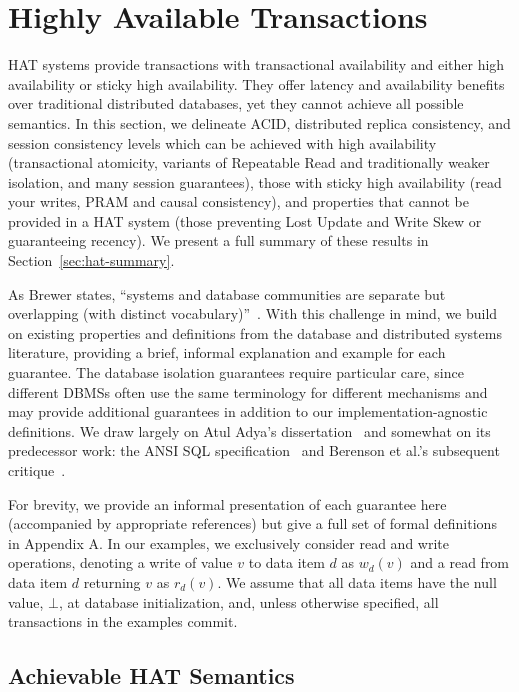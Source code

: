 
\section{Highly Available Transactions}
\label{sec:hats}

HAT systems provide transactions with transactional availability and
either high availability or sticky high availability. They offer
latency and availability benefits over traditional distributed
databases, yet they cannot achieve all possible semantics. In this
section, we delineate ACID, distributed replica consistency, and
session consistency levels which can be achieved with high
availability (transactional atomicity, variants of Repeatable Read and
traditionally weaker isolation, and many session guarantees), those
with sticky high availability (read your writes, PRAM and causal
consistency), and properties that cannot be provided in a HAT system
(those preventing Lost Update and Write Skew or guaranteeing recency).
We present a full summary of these results in
Section~\ref{sec:hat-summary}.

As Brewer states, ``systems and database communities are separate but
overlapping (with distinct vocabulary)''~\cite{brewer-slides}. With
this challenge in mind, we build on existing properties and
definitions from the database and distributed systems literature,
providing a brief, informal explanation and example for each
guarantee. The database isolation guarantees require particular care,
since different DBMSs often use the same terminology for different
mechanisms and may provide additional guarantees in addition to our
implementation-agnostic definitions.  We draw largely on Atul Adya's
dissertation~\cite{adya} and somewhat on its predecessor work: the
ANSI SQL specification~\cite{ansi-sql} and Berenson et al.'s
subsequent critique~\cite{ansicritique}.

For brevity, we provide an informal presentation of each guarantee
here (accompanied by appropriate references) but give a full set of
formal definitions in
 Appendix A.
In our examples, we exclusively consider read and write operations,
denoting a write of value $v$ to data item $d$ as $w_d(v)$ and a read
from data item $d$ returning $v$ as $r_d(v)$. We assume that all data
items have the null value, $\bot$, at database initialization, and,
unless otherwise specified, all transactions in the examples commit.

\subsection{Achievable HAT Semantics}


